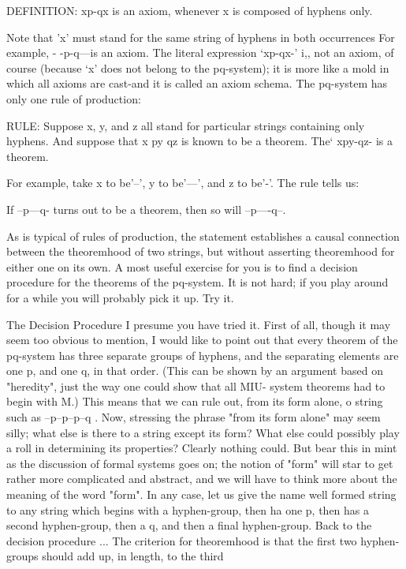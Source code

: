 DEFINITION: xp-qx is an axiom, whenever x is composed of hyphens only.

Note that 'x' must stand for the same string of hyphens in both occurrences For example, -
-p-q---is an axiom. The literal expression `xp-qx-' i,, not an axiom, of course (because `x'
does not belong to the pq-system); it is more like a mold in which all axioms are cast-and
it is called an axiom schema.
         The pq-system has only one rule of production:

RULE: Suppose x, y, and z all stand for particular strings containing only hyphens. And
suppose that x py qz is known to be a theorem. The` xpy-qz- is a theorem.

For example, take x to be'--', y to be'---', and z to be'-'. The rule tells us:

        If --p---q- turns out to be a theorem, then so will --p----q--.


As is typical of rules of production, the statement establishes a causal connection between
the theoremhood of two strings, but without asserting theoremhood for either one on its
own.
        A most useful exercise for you is to find a decision procedure for the theorems of
the pq-system. It is not hard; if you play around for a while you will probably pick it up.
Try it.


                                 The Decision Procedure
I presume you have tried it. First of all, though it may seem too obvious to mention, I
would like to point out that every theorem of the pq-system has three separate groups of
hyphens, and the separating elements are one p, and one q, in that order. (This can be
shown by an argument based on "heredity", just the way one could show that all MIU-
system theorems had to begin with M.) This means that we can rule out, from its form
alone, o string such as --p--p--p--q .
Now, stressing the phrase "from its form alone" may seem silly; what else is there to a
string except its form? What else could possibly play a roll in determining its properties?
Clearly nothing could. But bear this in mint as the discussion of formal systems goes on;
the notion of "form" will star to get rather more complicated and abstract, and we will
have to think more about the meaning of the word "form". In any case, let us give the
name well formed string to any string which begins with a hyphen-group, then ha one p,
then has a second hyphen-group, then a q, and then a final hyphen-group.
Back to the decision procedure ... The criterion for theoremhood is that the first two
hyphen-groups should add up, in length, to the third




